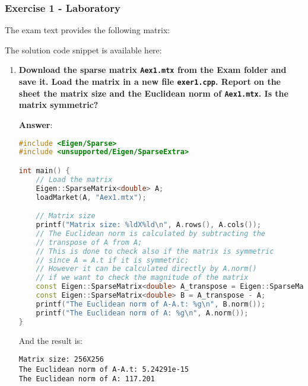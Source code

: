 \subsubsection*{Exercise 1 - Laboratory}

The exam text provides the following matrix:
\begin{center}
\end{center}
The solution code snippet is available here:
\begin{center}
\end{center}
\begin{enumerate}[label=\textcolor{Green3}{\textbf{\arabic*.}}]
    \item \textcolor{Green3}{\textbf{%
        Download the sparse matrix \texttt{Aex1.mtx} from the Exam folder and save it. Load the matrix in a new ﬁle \texttt{exer1.cpp}. Report on the sheet the matrix size and the Euclidean norm of \texttt{Aex1.mtx}. Is the matrix symmetric?%
    }}

    \textbf{Answer}:
    \begin{lstlisting}[language=C++]
#include <Eigen/Sparse>
#include <unsupported/Eigen/SparseExtra>

int main() {
    // Load the matrix
    Eigen::SparseMatrix<double> A;
    loadMarket(A, "Aex1.mtx");

    // Matrix size
    printf("Matrix size: %ldX%ld\n", A.rows(), A.cols());
    // The Euclidean norm is calculated by subtracting the
    // transpose of A from A;
    // This is done to check also if the matrix is symmetric
    // since A = A.t if it is symmetric;
    // However it can be calculated directly by A.norm()
    // if we want to check the magnitude of the matrix
    const Eigen::SparseMatrix<double> A_transpose = Eigen::SparseMatrix<double>(A.transpose());
    const Eigen::SparseMatrix<double> B = A_transpose - A;
    printf("The Euclidean norm of A-A.t: %g\n", B.norm());
    printf("The Euclidean norm of A: %g\n", A.norm());
}\end{lstlisting}
    And the result is:
    \begin{lstlisting}
Matrix size: 256X256
The Euclidean norm of A-A.t: 5.24291e-15
The Euclidean norm of A: 117.201\end{lstlisting}


    \newpage



\end{enumerate}

